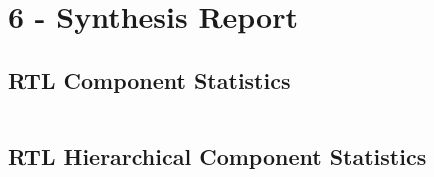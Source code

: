 \documentclass[11pt]{report}
\begin{document}
\newpage

\section*{6 - Synthesis Report}

\subsection*{RTL Component Statistics}
\inputminted[firstline=213,lastline=236]{text}{../../../DE_Project_T3/DE_Project_T3.runs/synth_1/TOP_LEVEL.vds}

\newpage

\subsection*{RTL Hierarchical Component Statistics}
\inputminted[firstline=239,lastline=290]{text}{../../../DE_Project_T3/DE_Project_T3.runs/synth_1/TOP_LEVEL.vds}
\end{document}
